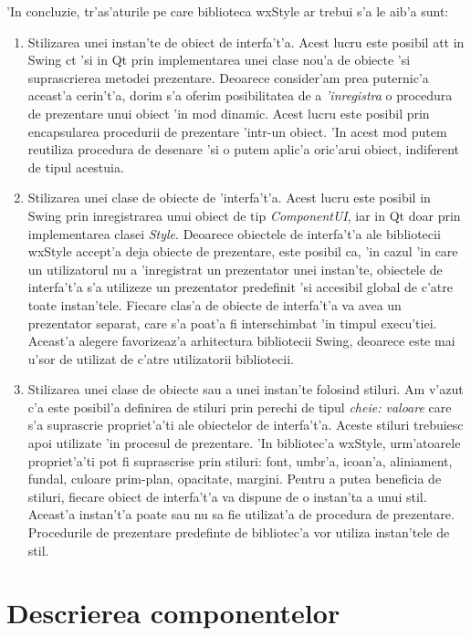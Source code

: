 'In concluzie, tr'as'aturile pe care biblioteca wxStyle ar trebui s'a le aib'a sunt:
\begin{enumerate}
\item Stilizarea unei instan'te de obiect de interfa't'a. Acest lucru este posibil at{\ia}t in Swing c{\ia}t 'si in Qt prin implementarea unei clase nou'a de obiecte 'si suprascrierea metodei prezentare. Deoarece consider'am prea puternic'a aceast'a cerin't'a, dorim s'a oferim posibilitatea de a \emph{'inregistra} o procedura de prezentare unui obiect 'in mod dinamic. Acest lucru este posibil prin encapsularea procedurii de prezentare 'intr-un obiect. 'In acest mod putem reutiliza procedura de desenare 'si o putem aplic'a oric'arui obiect, indiferent de tipul acestuia.
\item Stilizarea unei clase de obiecte de 'interfa't'a. Acest lucru este posibil in Swing prin inregistrarea unui obiect de tip \emph{ComponentUI}, iar in Qt doar prin implementarea clasei \emph{Style}. Deoarece obiectele de interfa't'a ale bibliotecii wxStyle accept'a deja obiecte de prezentare, este posibil ca, 'in cazul 'in care un utilizatorul nu a 'inregistrat un prezentator unei instan'te, obiectele de interfa't'a s'a utilizeze un prezentator predefinit 'si accesibil global de c'atre toate instan'tele. Fiecare clas'a de obiecte de interfa't'a va avea un prezentator separat, care s'a poat'a fi interschimbat 'in timpul execu'tiei. Aceast'a alegere favorizeaz'a arhitectura bibliotecii Swing, deoarece este mai u'sor de utilizat de c'atre utilizatorii bibliotecii.
\item Stilizarea unei clase de obiecte sau a unei instan'te folosind stiluri. Am v'azut c'a este posibil'a definirea de stiluri prin perechi de tipul \emph{cheie: valoare} care s'a suprascrie propriet'a'ti ale obiectelor de interfa't'a. Aceste stiluri trebuiesc apoi utilizate 'in procesul de prezentare. 'In bibliotec'a wxStyle, urm'atoarele propriet'a'ti pot fi suprascrise prin stiluri: font, umbr'a, icoan'a, aliniament, fundal, culoare prim-plan, opacitate, margini. Pentru a putea beneficia de stiluri, fiecare obiect de interfa't'a va dispune de o instan'ta a unui stil. Aceast'a instan't'a poate sau nu sa fie utilizat'a de procedura de prezentare. Procedurile de prezentare predefinte de bibliotec'a vor utiliza instan'tele de stil.
\end{enumerate}

\section{Descrierea componentelor}


